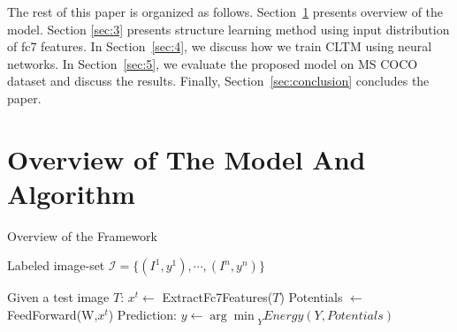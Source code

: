 \documentclass{article}
\begin{document}
The rest of this paper is organized as follows. Section~\ref{sec:2}
presents overview of the model. Section \ref{sec:3} presents structure learning method using input distribution of fc7 features. In Section~\ref{sec:4}, we discuss how we train CLTM using neural networks. In Section~\ref{sec:5}, we evaluate the proposed model on MS COCO dataset and discuss the results.  Finally, Section~\ref{sec:conclusion} concludes the paper.


\section{Overview of The Model And Algorithm}\label{sec:2}


\begin{algorithm}[t]
 \caption{Overview of the Framework}
 \label{algo:overview}
 \begin{algorithmic}[1]
 \REQUIRE Labeled image-set $\mathcal{I} = \{(I^{1},y^{1}),\cdots,(I^{n},y^{n})\}$



 	\REPEAT
	 
	 
	
 		\STATE Given a test image $T$: $x^{t} \leftarrow$  ExtractFc7Features($T$)
	 \STATE  Potentials $\leftarrow$ FeedForward(W,$x^{t}$)
	 \STATE   Prediction: $y \leftarrow {\arg\min}_{ Y } Energy(Y,Potentials)$

 \end{algorithmic}
 \end{algorithm}
\end{document}
